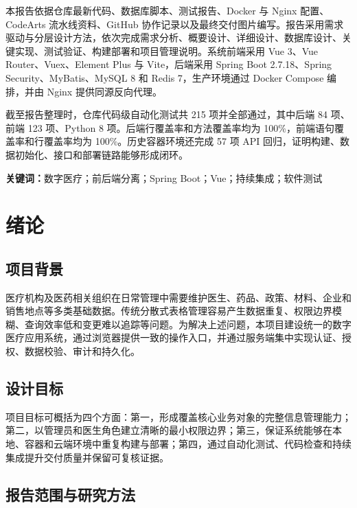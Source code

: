 \documentclass[UTF8,a4paper,12pt,openany,fontset=windows]{ctexrep}
\begin{document}
本报告依据仓库最新代码、数据库脚本、测试报告、Docker 与 Nginx 配置、CodeArts 流水线资料、GitHub 协作记录以及最终交付图片编写。报告采用需求驱动与分层设计方法，依次完成需求分析、概要设计、详细设计、数据库设计、关键实现、测试验证、构建部署和项目管理说明。系统前端采用 Vue 3、Vue Router、Vuex、Element Plus 与 Vite，后端采用 Spring Boot 2.7.18、Spring Security、MyBatis、MySQL 8 和 Redis 7，生产环境通过 Docker Compose 编排，并由 Nginx 提供同源反向代理。

截至报告整理时，仓库代码级自动化测试共 215 项并全部通过，其中后端 84 项、前端 123 项、Python 8 项。后端行覆盖率和方法覆盖率均为 100\%，前端语句覆盖率和行覆盖率均为 100\%。历史容器环境还完成 57 项 API 回归，证明构建、数据初始化、接口和部署链路能够形成闭环。

\noindent\textbf{关键词：}数字医疗；前后端分离；Spring Boot；Vue；持续集成；软件测试

\clearpage
\tableofcontents
\clearpage
\listoffigures
{}
\clearpage
\listoftables
{}

\clearpage
{}

\chapter{绪论}

\section{项目背景}

医疗机构及医药相关组织在日常管理中需要维护医生、药品、政策、材料、企业和销售地点等多类基础数据。传统分散式表格管理容易产生数据重复、权限边界模糊、查询效率低和变更难以追踪等问题。为解决上述问题，本项目建设统一的数字医疗应用系统，通过浏览器提供一致的操作入口，并通过服务端集中实现认证、授权、数据校验、审计和持久化。

\section{设计目标}

项目目标可概括为四个方面：第一，形成覆盖核心业务对象的完整信息管理能力；第二，以管理员和医生角色建立清晰的最小权限边界；第三，保证系统能够在本地、容器和云端环境中重复构建与部署；第四，通过自动化测试、代码检查和持续集成提升交付质量并保留可复核证据。

\section{报告范围与研究方法}
\end{document}
